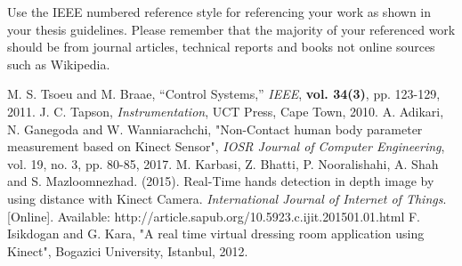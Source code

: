 Use the IEEE numbered reference style for referencing your work as shown in your thesis guidelines.
Please remember that the majority of your referenced work should be from journal articles, technical
reports and books not online sources such as Wikipedia.

\begin{thebibliography}{5}
 M. S. Tsoeu and M. Braae, ``Control Systems,'' \emph{IEEE}, {\bf vol. 34(3)}, pp. 123-129, 2011.
 J. C. Tapson, \emph{Instrumentation}, UCT Press, Cape Town, 2010.
 A. Adikari, N. Ganegoda and W. Wanniarachchi, "Non-Contact human body parameter measurement based on Kinect Sensor", \emph{IOSR Journal of Computer Engineering}, vol. 19, no. 3, pp. 80-85, 2017. 
 M. Karbasi, Z. Bhatti, P. Nooralishahi, A. Shah and S. Mazloomnezhad. (2015). Real-Time hands detection in depth image by using distance with Kinect Camera. \emph{International Journal of Internet of Things}. [Online]. Available: http://article.sapub.org/10.5923.c.ijit.201501.01.html
 F. Isikdogan and G. Kara, "A real time virtual dressing room application using Kinect", Bogazici University, Istanbul, 2012.
\end{thebibliography}
